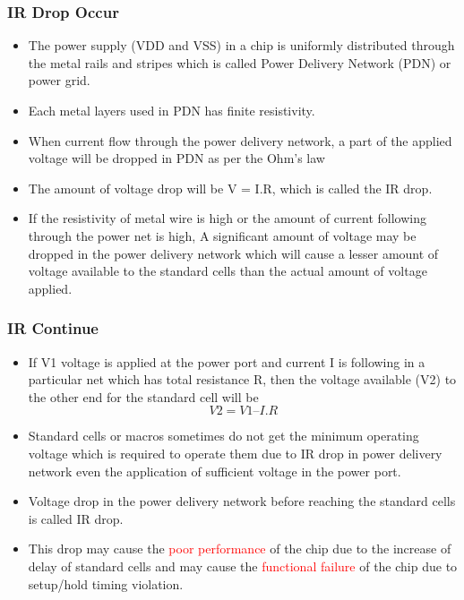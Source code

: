 \documentclass{beamer}
\begin{document}
	\begin{frame}
		\frametitle{IR Drop Occur}
		\begin{itemize}
			\item The power supply (VDD and VSS) in a chip is uniformly distributed through the metal rails and stripes which is called Power Delivery Network (PDN) or power grid.
			\item Each metal layers used in PDN has finite resistivity.
			\item When current flow through the power delivery network, a part of the applied voltage will be dropped in PDN as per the Ohm’s law
			\item The amount of voltage drop will be V = I.R, which is called the IR drop. 
			\item If the resistivity of metal wire is high or the amount of current following through the power net is high, A significant amount of voltage may be dropped in the power delivery network which will cause a lesser amount of voltage available to the standard cells than the actual amount of voltage applied.
		\end{itemize}
		
	\end{frame}
	
	\begin{frame}
		\frametitle{IR Continue}
		\begin{itemize}
			\item If V1 voltage is applied at the power port and current I is following in a particular net which has total resistance R, then the voltage available (V2) to the other end for the standard cell will be
				\begin{equation}
					V2 = V1 – I.R
				\end{equation}  
			\item Standard cells or macros sometimes do not get the minimum operating voltage which is required to operate them due to IR drop in power delivery network even the application of sufficient voltage in the power port. 
			\item Voltage drop in the power delivery network before reaching the standard cells is called IR drop. 
			\item This drop may cause the \textcolor{red} {poor performance} of the chip due to the increase of delay of standard cells and may cause the \textcolor{red} {functional failure} of the chip due to setup/hold timing violation. 
		\end{itemize}
	\end{frame}
	
\end{document}
